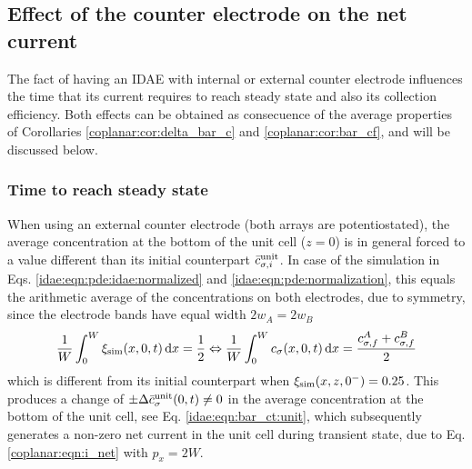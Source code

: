 \subsection{Effect of the counter electrode on the net current}

The fact of having an IDAE with internal or external counter electrode
influences the time that its current requires to reach steady state
and also its collection efficiency.
Both effects can be obtained as consecuence of the average properties of
Corollaries \ref{coplanar:cor:delta_bar_c} and \ref{coplanar:cor:bar_cf},
and will be discussed below.

\subsubsection{Time to reach steady state}

When using an external counter electrode (both arrays are potentiostated),
the average concentration at the bottom of the unit cell ($z = 0$)
is in general forced to a value different than its initial counterpart $\bar{c}_{\sigma,i}^{\text{unit}}$.
In case of the simulation in Eqs. \eqref{idae:eqn:pde:idae:normalized} and \eqref{idae:eqn:pde:normalization},
this equals the arithmetic average of the concentrations on both electrodes,
due to symmetry, since the electrode bands have equal width $2w_{A} = 2w_{B}$
\begin{equation}
	\label{idae:eqn:bar_x_sim}
	\frac{1}{W} \int_{0}^{W} \xi_{\mathrm{sim}}(x,0,t) \,\mathrm{d}x = \frac{1}{2}
	\Leftrightarrow
	\frac{1}{W} \int_{0}^{W} c_{\sigma}(x,0,t) \,\mathrm{d}x
	= \frac{c_{\sigma,f}^{A} + c_{\sigma,f}^{B}}{2}
\end{equation}
which is different from its initial counterpart when $\xi_{\mathrm{sim}}(x,z,0^{-}) = \num{0,25}$.
This produces a change of $\pm \Delta\bar{c}_{\sigma}^{\text{unit}}(0,t) \neq 0$
in the average concentration at the bottom of the unit cell,
see Eq. \eqref{idae:eqn:bar_ct:unit},
which subsequently generates a non-zero net current in the unit cell during transient state,
due to Eq. \eqref{coplanar:eqn:i_net} with $p_{x} = 2W$.

